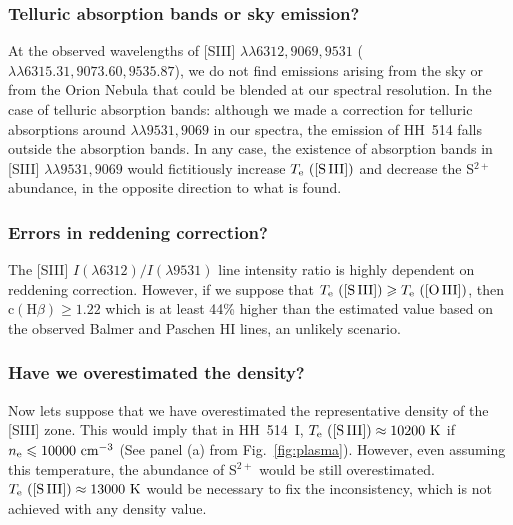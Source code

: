 \documentclass[fleqn,usenatbib]{mnras}
\begin{document}
\subsubsection{Telluric absorption bands or sky emission?}
\label{subsec:tell_abs_sky_emmision}

At the observed wavelengths of [S\thinspace III] $\lambda \lambda 6312, 9069, 9531$ ($\lambda \lambda 6315.31,9073.60, 9535.87$), we do not find emissions arising from the sky or from the Orion Nebula that could be blended at our spectral resolution. In the case of telluric absorption bands: although we made a correction for telluric absorptions around $\lambda \lambda 9531, 9069$ in our spectra, the emission of HH~514 falls outside the absorption bands. In any case, the existence of absorption bands in [S\thinspace III] $\lambda \lambda 9531, 9069$ would fictitiously increase $T_{\rm e} \text{ ([S\thinspace III])}$ and decrease the S$^{2+}$ abundance, in the opposite direction to what is found.

\subsubsection{Errors in reddening correction?}
\label{subsec:errors_CHB}

The [S\thinspace III] $I(\lambda 6312)/I(\lambda 9531)$ line intensity ratio is highly dependent on reddening correction. However, if we suppose that $T_{\rm e} \text{ ([S\thinspace III])} \geq T_{\rm e} \text{ ([O\thinspace III])}$, then $\text{c}(\text{H}\beta)\geq 1.22$ which is at least 44\% higher than the estimated value based on the observed Balmer and Paschen H\thinspace I lines, an unlikely scenario.

\subsubsection{Have we overestimated the density?}
\label{subsec:ov_density}

Now lets suppose that we have overestimated the representative density of the [S\thinspace III] zone. This would imply that in HH~514~I, $T_{\rm e} \text{ ([S\thinspace III])} \approx 10200 \text{ K}$ if $n_{\rm e} \leq 10000 \text{ cm}^{-3}$ (See panel (a) from Fig.~\ref{fig:plasma}). However, even assuming this temperature, the abundance of S$^{2+}$ would be still overestimated. $T_{\rm e} \text{ ([S\thinspace III])} \approx 13000 \text{ K}$ would be necessary to fix the inconsistency, which is not achieved with any density value.
\end{document}
